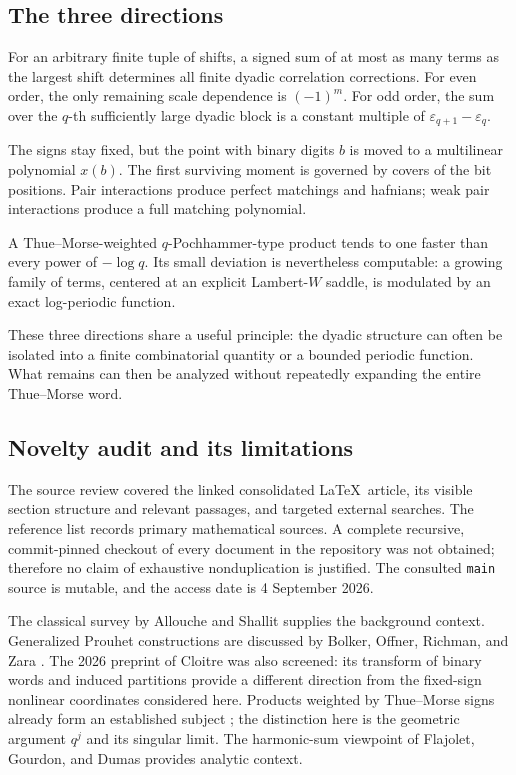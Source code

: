 \documentclass[11pt,oneside]{article}
\numberwithin{equation}{section}
\theoremstyle{definition}
\theoremstyle{remark}
\newcommand{\eps}{\varepsilon}
\begin{document}
\subsection{The three directions}
\begin{description}[leftmargin=0pt,labelsep=0.7em]
\item[Boundary defects.] For an arbitrary finite tuple of shifts, a signed sum
of at most as many terms as the largest shift determines all finite dyadic
correlation corrections. For even order, the only remaining scale dependence
is \((-1)^m\). For odd order, the sum over the \(q\)-th sufficiently large dyadic
block is a constant multiple of \(\eps_{q+1}-\eps_q\).
\item[Nonlinear Prouhet geometry.] The signs stay fixed, but the point with
binary digits \(b\) is moved to a multilinear polynomial \(x(b)\). The first
surviving moment is governed by covers of the bit positions. Pair interactions
produce perfect matchings and hafnians; weak pair interactions produce a full
matching polynomial.
\item[Flat automatic products.] A Thue--Morse-weighted \(q\)-Pochhammer-type
product tends to one faster than every power of \(-\log q\). Its small deviation
is nevertheless computable: a growing family of terms, centered at an explicit
Lambert-\(W\) saddle, is modulated by an exact log-periodic function.
\end{description}

These three directions share a useful principle: the dyadic structure can often
be isolated into a finite combinatorial quantity or a bounded periodic function.
What remains can then be analyzed without repeatedly expanding the entire
Thue--Morse word.

\subsection{Novelty audit and its limitations}
The source review covered the linked consolidated \LaTeX\ article, its visible
section structure and relevant passages, and targeted external searches. The
reference list records primary mathematical sources. A complete recursive,
commit-pinned checkout of every document in the repository was not obtained;
therefore no claim of exhaustive nonduplication is justified. The consulted
\texttt{main} source is mutable, and the access date is 4 September 2026.

The classical survey by Allouche and Shallit \cite{ubiquitous} supplies the
background context. Generalized Prouhet constructions are discussed by Bolker,
Offner, Richman, and Zara \cite{bolker}. The 2026 preprint of Cloitre \cite{cloitre}
was also screened: its transform of binary words and induced partitions provide
a different direction from the fixed-sign nonlinear coordinates considered
here. Products weighted by Thue--Morse signs already form an established subject
\cite{ars,li}; the distinction here is the geometric argument \(q^j\) and its
singular limit. The harmonic-sum viewpoint of Flajolet, Gourdon, and Dumas
\cite{fgd} provides analytic context.
\end{document}
